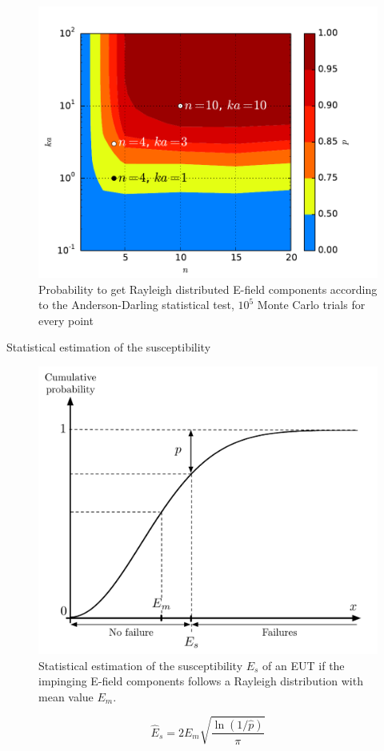 \documentclass[final,hyperref={pdfpagelabels=false}]{beamer}
\begin{document}
\begin{frame}{}
\begin{columns}[t]
    \begin{column}{0.32\linewidth}
\vspace{-1cm}
\vspace{-0.6cm}
\begin{figure}
\centering
\includegraphics[trim=0 0 0 0,clip,width=0.7\columnwidth]{./img/TestAD}
\vspace{-0.3cm}
\large{\caption{Probability to get Rayleigh distributed E-field components according to the Anderson-Darling statistical test, $10^5$ Monte Carlo trials for every point}}
\end{figure}

 \begin{block}{Statistical estimation of the susceptibility}
\vspace{-0.6cm}
\begin{figure}
\centering
\includegraphics[trim=0 0 0 0,clip,width=0.8\columnwidth]{./img/rayleighCDF}
\vspace{-0.3cm}
\large{\caption{Statistical estimation of the susceptibility $E_s$ \cite{Amador13} of an EUT if the impinging E-field components follows a Rayleigh distribution with mean value $E_m$.}}
\end{figure}
\large{
\begin{equation*}
\hat{E}_s=2E_m\sqrt{\frac{\ln(1/\hat{p})}{\pi}}
\end{equation*}}



\end{block}
\end{column}
\end{columns}
\end{frame}
\end{document}
